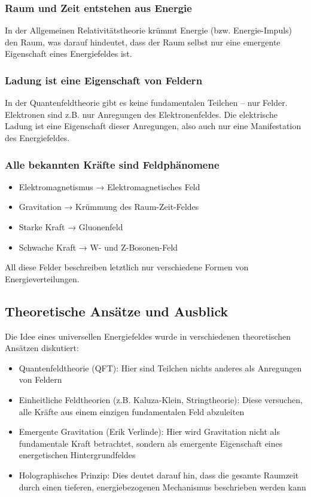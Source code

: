 \documentclass{article}
\begin{document}
	\subsubsection{Raum und Zeit entstehen aus Energie}
	In der Allgemeinen Relativitätstheorie krümmt Energie (bzw. Energie-Impuls) den Raum, was darauf hindeutet, dass der Raum selbst nur eine emergente Eigenschaft eines Energiefeldes ist.
	
	\subsubsection{Ladung ist eine Eigenschaft von Feldern}
	In der Quantenfeldtheorie gibt es keine fundamentalen Teilchen – nur Felder. Elektronen sind z.B. nur Anregungen des Elektronenfeldes. Die elektrische Ladung ist eine Eigenschaft dieser Anregungen, also auch nur eine Manifestation des Energiefeldes.
	
	\subsubsection{Alle bekannten Kräfte sind Feldphänomene}
	\begin{itemize}
		\item Elektromagnetismus → Elektromagnetisches Feld
		\item Gravitation → Krümmung des Raum-Zeit-Feldes
		\item Starke Kraft → Gluonenfeld
		\item Schwache Kraft → W- und Z-Bosonen-Feld
	\end{itemize}
	
	All diese Felder beschreiben letztlich nur verschiedene Formen von Energieverteilungen.
	
	\subsection{Theoretische Ansätze und Ausblick}
	
	Die Idee eines universellen Energiefeldes wurde in verschiedenen theoretischen Ansätzen diskutiert:
	
	\begin{itemize}
		\item Quantenfeldtheorie (QFT): Hier sind Teilchen nichts anderes als Anregungen von Feldern
		\item Einheitliche Feldtheorien (z.B. Kaluza-Klein, Stringtheorie): Diese versuchen, alle Kräfte aus einem einzigen fundamentalen Feld abzuleiten
		\item Emergente Gravitation (Erik Verlinde): Hier wird Gravitation nicht als fundamentale Kraft betrachtet, sondern als emergente Eigenschaft eines energetischen Hintergrundfeldes
		\item Holographisches Prinzip: Dies deutet darauf hin, dass die gesamte Raumzeit durch einen tieferen, energiebezogenen Mechanismus beschrieben werden kann
	\end{itemize}
	
\end{document}
